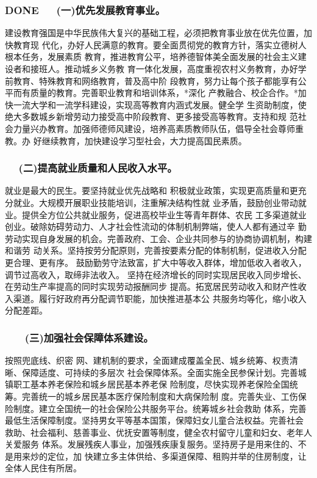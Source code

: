 \documentclass[11pt]{ctexart}
\begin{document}
{{{{\subsubsection{{\bfseries\sffamily DONE} 　 (一)优先发展教育事业。}
\label{sec:org5e266bc}
建设教育强国是中华民族伟大复兴的基础工程，必须把教育事业放在优先位置，加快教育现
代化，办好人民满意的教育。要全面贯彻党的教育方针，落实立德树人根本任务，发展素质
教育，推进教育公平，培养德智体美全面发展的社会主义建设者和接班人。推动城乡义务教
育一体化发展，高度重视农村义务教育，办好学前教育、特殊教育和网络教育，普及高中阶
段教育，努力让每个孩子都能享有公平而有质量的教育。完善职业教育和培训体系，*深化
产教融合、校企合作。*加快一流大学和一流学科建设，实现高等教育内涵式发展。健全学
生资助制度，使绝大多数城乡新增劳动力接受高中阶段教育、更多接受高等教育。支持和规
范社会力量兴办教育。加强师德师风建设，培养高素质教师队伍，倡导全社会尊师重教。办
好继续教育，加快建设学习型社会，大力提高国民素质。


\subsubsection{　 (二)提高就业质量和人民收入水平。}
\label{sec:org512a2c7}

就业是最大的民生。要坚持就业优先战略和
积极就业政策，实现更高质量和更充分就业。大规模开展职业技能培训，注重解决结构性就
业矛盾，鼓励创业带动就业。提供全方位公共就业服务，促进高校毕业生等青年群体、农民
工多渠道就业创业。破除妨碍劳动力、人才社会性流动的体制机制弊端，使人人都有通过辛
勤劳动实现自身发展的机会。完善政府、工会、企业共同参与的协商协调机制，构建和谐劳
动关系。坚持按劳分配原则，完善按要素分配的体制机制，促进收入分配更合理、更有序。
鼓励勤劳守法致富，扩大中等收入群体，增加低收入者收入，调节过高收入，取缔非法收入。
坚持在经济增长的同时实现居民收入同步增长、在劳动生产率提高的同时实现劳动报酬同步
提高。拓宽居民劳动收入和财产性收入渠道。履行好政府再分配调节职能，加快推进基本公
共服务均等化，缩小收入分配差距。

\subsubsection{　　(三)加强社会保障体系建设。}
\label{sec:orgf50409e}

按照兜底线、织密
网、建机制的要求，全面建成覆盖全民、城乡统筹、权责清晰、保障适度、可持续的多层次
社会保障体系。全面实施全民参保计划。完善城镇职工基本养老保险和城乡居民基本养老保
险制度，尽快实现养老保险全国统筹。完善统一的城乡居民基本医疗保险制度和大病保险制
度。完善失业、工伤保险制度。建立全国统一的社会保险公共服务平台。统筹城乡社会救助
体系，完善最低生活保障制度。坚持男女平等基本国策，保障妇女儿童合法权益。完善社会
救助、社会福利、慈善事业、优抚安置等制度，健全农村留守儿童和妇女、老年人关爱服务
体系。发展残疾人事业，加强残疾康复服务。坚持房子是用来住的、不是用来炒的定位，加
快建立多主体供给、多渠道保障、租购并举的住房制度，让全体人民住有所居。

}}}}
\end{document}
